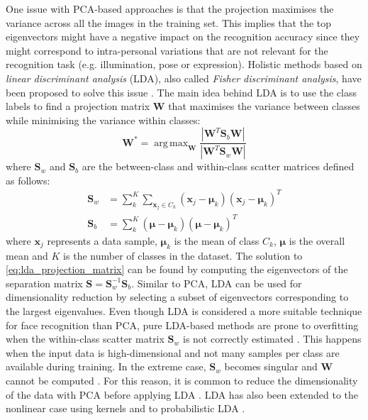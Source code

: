 \documentclass[conference]{IEEEtran}
\DeclareMathOperator*{\argmax}{arg\,max}
\begin{document}
One issue with PCA-based approaches is that the projection maximises the variance across all the images in the training set. This implies that the top eigenvectors might have a negative impact on the recognition accuracy since they might correspond to intra-personal variations that are not relevant for the recognition task (e.g. illumination, pose or expression). Holistic methods based on \textit{linear discriminant analysis} (LDA), also called \textit{Fisher discriminant analysis}, \cite{fisher1938statistical} have been proposed to solve this issue \cite{belhumeur1997eigenfaces,etemad1997discriminant,zhao1998discriminant,zhao1999subspace}. The main idea behind LDA is to use the class labels to find a projection matrix $\bm{W}$ that maximises the variance between classes while minimising the variance within classes:
\begin{equation}
    \bm{W}^*=\argmax_{\bm{W}}\frac{|\bm{W}^T\bm{S}_b\bm{W}|}{|\bm{W}^T\bm{S}_w\bm{W}|}
    \label{eq:lda_projection_matrix}
\end{equation}
where $\bm{S}_w$ and $\bm{S}_b$ are the between-class and within-class scatter matrices defined as follows:
\begin{align}
    \bm{S}_w &= \sum^K_k{\sum_{\bm{x}_j \in C_k}{(\bm{x}_j-\bm{\mu}_k)(\bm{x}_j-\bm{\mu}_k)^T}}
    \label{eq:lda_between_scatter_matrix} \\
    \bm{S}_b &= \sum^K_k{(\bm{\mu}-\bm{\mu}_k)(\bm{\mu}-\bm{\mu}_k)^T}
    \label{eq:lda_whithin_scatter_matrix}
\end{align}
where $\bm{x}_j$ represents a data sample, $\bm{\mu}_k$ is the mean of class $C_k$, $\bm{\mu}$ is the overall mean and $K$ is the number of classes in the dataset. The solution to \cref{eq:lda_projection_matrix} can be found by computing the eigenvectors of the separation matrix $\bm{S} = \bm{S}_w^{-1}\bm{S}_b$. Similar to PCA, LDA can be used for dimensionality reduction by selecting a subset of eigenvectors corresponding to the largest eigenvalues. Even though LDA is considered a more suitable technique for face recognition than PCA, pure LDA-based methods are prone to overfitting when the within-class scatter matrix $\bm{S}_w$ is not correctly estimated \cite{zhao1998discriminant,zhao1999subspace}. This happens when the input data is high-dimensional and not many samples per class are available during training. In the extreme case, $\bm{S}_w$ becomes singular and $\bm{W}$ cannot be computed \cite{belhumeur1997eigenfaces}. For this reason, it is common to reduce the dimensionality of the data with PCA before applying LDA \cite{belhumeur1997eigenfaces,zhao1998discriminant,zhao1999subspace}. LDA has also been extended to the nonlinear case using kernels \cite{mika1999fisher,liu2002face} and to probabilistic LDA \cite{ioffe2006probabilistic}.
\end{document}
